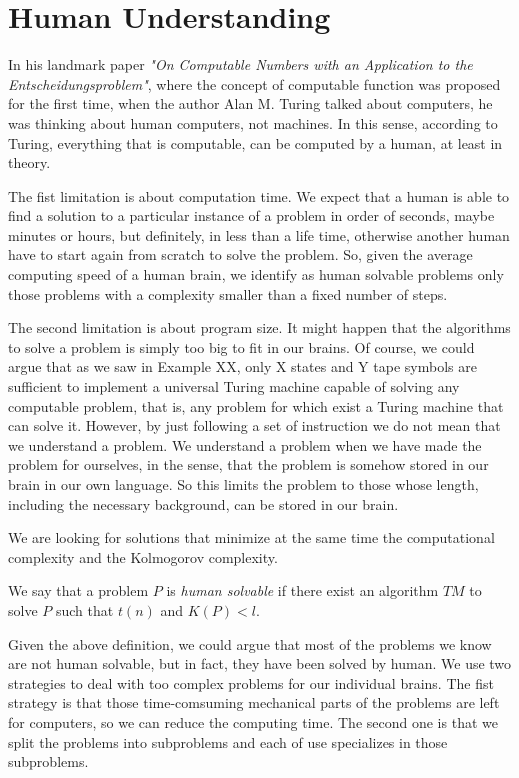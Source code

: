 %
%
\section{Human Understanding}

In his landmark paper \emph{"On Computable Numbers with an Application to the Entscheidungsproblem"}, where the concept of computable function was proposed for the first time, when the author Alan M. Turing talked about computers, he was thinking about human computers, not machines. In this sense, according to Turing, everything that is computable, can be computed by a human, at least in theory.

The fist limitation is about computation time. We expect that a human is able to find a solution to a particular instance of a problem in order of seconds, maybe minutes or hours, but definitely, in less than a life time, otherwise another human have to start again from scratch to solve the problem. So, given the average computing speed of a human brain, we identify as human solvable problems only those problems with a complexity smaller than a fixed number of steps.

The second limitation is about program size. It might happen that the algorithms to solve a problem is simply too big to fit in our brains. Of course, we could argue that {\color{red} as we saw in Example XX, only X states and Y tape symbols} are sufficient to implement a universal Turing machine capable of solving any computable problem, that is, any problem for which exist a Turing machine that can solve it. However, by just following a set of instruction we do not mean that we understand a problem. We understand a problem when we have made the problem for ourselves, in the sense, that the problem is somehow stored in our brain in our own language. So this limits the problem to those whose length, including the necessary background, can be stored in our brain.

We are looking for solutions that minimize at the same time the computational complexity and the Kolmogorov complexity.

\begin{definition}
We say that a problem $P$ is \emph{human solvable} if there exist an algorithm $TM$ to solve $P$ such that $t(n)$ and $K(P) < l$.
\end{definition}

Given the above definition, we could argue that most of the problems we know are not human solvable, but in fact, they have been solved by human. We use two strategies to deal with too complex problems for our individual brains. The fist strategy is that those time-comsuming mechanical parts of the problems are left for computers, so we can reduce the computing time. The second one is that we split the problems into subproblems and each of use specializes in those subproblems.

